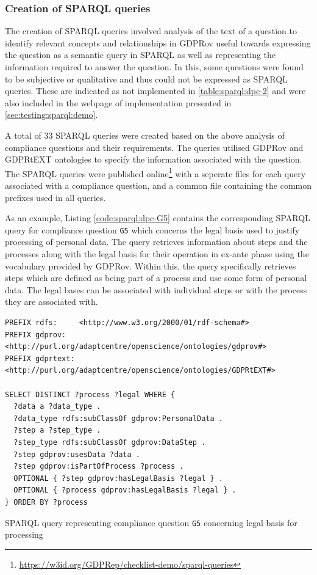\subsubsection{Creation of SPARQL queries}
The creation of SPARQL queries involved analysis of the text of a question to identify relevant concepts and relationships in GDPRov useful towards expressing the question as a semantic query in SPARQL as well as representing the information required to answer the question.
In this, some questions were found to be subjective or qualitative and thus could not be expressed as SPARQL queries. These are indicated as not implemented in \autoref{table:sparql:dpc-2} and were also included in the webpage of implementation presented in \autoref{sec:testing:sparql:demo}.

A total of 33 SPARQL queries were created based on the above analysis of compliance questions and their requirements.
The queries utilised GDPRov and GDPRtEXT ontologies to specify the information associated with the question.
The SPARQL queries were published online\footnote{\url{https://w3id.org/GDPRep/checklist-demo/sparql-queries}}
with a seperate files for each query associated with a compliance question, and a common file containing the common prefixes used in all queries.

As an example, Listing \autoref{code:sparql:dpc-G5} contains the corresponding SPARQL query for compliance question \texttt{G5} which concerns the legal basis used to justify processing of personal data. 
The query retrieves information about steps and the processes along with the legal basis for their operation in ex-ante phase using the vocabulary provided by GDPRov.
Within this, the query specifically retrieves steps which are defined as being part of a process and use some form of personal data. 
The legal bases can be associated with individual steps or with the process they are associated with.
\begin{listing}[htbp]
\begin{verbatim}
PREFIX rdfs:     <http://www.w3.org/2000/01/rdf-schema#>
PREFIX gdprov:   <http://purl.org/adaptcentre/openscience/ontologies/gdprov#>
PREFIX gdprtext: <http://purl.org/adaptcentre/openscience/ontologies/GDPRtEXT#>

SELECT DISTINCT ?process ?legal WHERE {
  ?data a ?data_type .
  ?data_type rdfs:subClassOf gdprov:PersonalData .
  ?step a ?step_type .
  ?step_type rdfs:subClassOf gdprov:DataStep .
  ?step gdprov:usesData ?data . 
  ?step gdprov:isPartOfProcess ?process .
  OPTIONAL { ?step gdprov:hasLegalBasis ?legal } .
  OPTIONAL { ?process gdprov:hasLegalBasis ?legal } .
} ORDER BY ?process
\end{verbatim}
\caption{SPARQL query representing compliance question \texttt{G5} concerning legal basis for processing}
\label{code:sparql:dpc-G5}
\end{listing}

